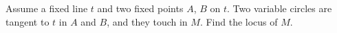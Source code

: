 Assume a fixed line $t$ and two fixed points $A$, $B$ on $t$. Two variable circles are tangent to $t$ in $A$ and $B$, and they touch in $M$. Find the locus of $M$.
